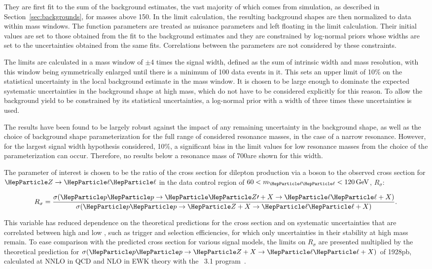 \documentclass[11pt,twoside,a4paper,cmspaper,final,collab]{cms-tdr}
\begin{document}
They are first fit to the sum of the background estimates, the vast majority of which comes from simulation, as described in Section~\ref{sec:backgrounds}, for masses above 150\GeV. In the limit calculation, the resulting background shapes are then normalized to data within mass windows. The function parameters are treated as nuisance parameters and left floating in the limit calculation. Their initial values are set to those obtained from the fit to the background estimates and they are constrained by log-normal priors whose widths are set to the uncertainties obtained from the same fits. Correlations between the parameters are not considered by these constraints.    

The limits are calculated in a mass window of $\pm$4 times the signal width, defined as the sum of intrinsic width and mass resolution, with this window being symmetrically enlarged until there is a minimum of 100 data events in it. This sets an upper limit of 10\% on the statistical uncertainty in the local background estimate in the mass window. It is chosen to be large enough to  dominate the expected systematic uncertainties in the background shape at high mass, which do not have to be considered explicitly for this reason. To allow the background yield to be constrained by its statistical uncertainties, a log-normal prior with a width of three times these uncertainties is used. 

The results have been found to be largely robust against the impact of any remaining uncertainty in the background shape, as well as the choice of background shape parameterization for the full range of considered resonance masses, in the case of a narrow resonance. However, for the largest signal width hypothesis considered, 10\%, a significant bias in the limit values for low resonance masses from the choice of the parameterization can occur. Therefore, no results below a resonance mass of 700\GeV are shown for this width.

The parameter of interest is chosen to be the ratio of the cross section for dilepton production via a \PZpr boson to the observed cross section for $\PZ \to \Pell\Pell$ in the data control region of $60 < \mll < 120\GeV$, $R_{\sigma}$:
\begin{linenomath} 
\begin{equation}
\label{eq:rsigma}
R_\sigma = \frac{\sigma(\Pp\Pp\to \cPZpr+X\to\Pell\Pell+X)}
                {\sigma(\Pp\Pp\to \cPZ+X  \to\Pell\Pell+X)}.
\end{equation}
\end{linenomath}                 
This variable has reduced dependence on the theoretical predictions for the \PZpr cross section and on systematic uncertainties that are correlated between high and low \mll, such as trigger and selection efficiencies, for which only uncertainties in their stability at high mass remain. To ease comparison with the predicted cross section for various signal models, the limits on $R_\sigma$ are presented multiplied by the theoretical prediction for $\sigma(\Pp\Pp\to \cPZ+X\to\Pell\Pell+X)$ of 1928\unit{pb}, calculated at NNLO in QCD and NLO in EWK theory with the \FEWZ~3.1 program~\cite{Li:2012wna}.
\end{document}
